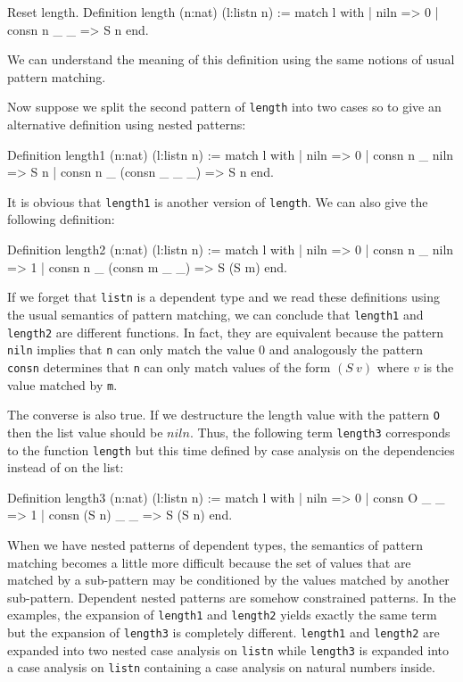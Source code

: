 \begin{coq_example}
Reset length.
Definition length (n:nat) (l:listn n) :=
  match l with
  | niln => 0
  | consn n _ _ => S n
  end.
\end{coq_example}

We can understand the meaning of this definition using the
same notions of usual pattern matching.

%
%
\iffalse
Now suppose we split the second pattern  of \texttt{length} into two 
cases so to give an
alternative definition using nested patterns:
\begin{coq_example}
Definition length1 (n:nat) (l:listn n) :=
  match l with
  | niln => 0
  | consn n _ niln => S n
  | consn n _ (consn _ _ _) => S n
  end.
\end{coq_example}

It is obvious that \texttt{length1} is  another version of
\texttt{length}. We can also give the following definition:
\begin{coq_example}
Definition length2 (n:nat) (l:listn n) :=
  match l with
  | niln => 0
  | consn n _ niln => 1
  | consn n _ (consn m _ _) => S (S m)
  end.
\end{coq_example}

If we forget that \texttt{listn} is a dependent type and we read these
definitions using the usual semantics of pattern matching,  we can conclude
that \texttt{length1}
and \texttt{length2} are different functions.
In fact, they are equivalent
because the pattern \texttt{niln} implies that \texttt{n} can only match
the value $0$ and analogously the pattern \texttt{consn} determines that \texttt{n} can
only match  values of the form  $(S~v)$ where $v$ is the value matched by
\texttt{m}. 

The converse is also true. If
we destructure the  length  value with the pattern \texttt{O} then the list
value should be $niln$. 
Thus, the following term \texttt{length3} corresponds to the function
\texttt{length} but this time defined by case analysis on the dependencies instead of on the list:

\begin{coq_example}
Definition length3 (n:nat) (l:listn n) :=
  match l with
  | niln => 0
  | consn O _ _ => 1
  | consn (S n) _ _ => S (S n)
  end.
\end{coq_example}

When we have nested patterns of dependent types, the semantics of
pattern matching becomes a little more difficult because
the set of values that are matched by a sub-pattern may be conditioned by the
values matched by another sub-pattern. Dependent nested patterns are
somehow constrained patterns. 
In the examples, the expansion of
\texttt{length1} and \texttt{length2} yields exactly the same term
 but the
expansion of \texttt{length3} is completely different. \texttt{length1} and
\texttt{length2} are expanded into two nested case analysis on
\texttt{listn} while \texttt{length3} is expanded into a case analysis on
\texttt{listn} containing a case analysis on natural numbers inside.


